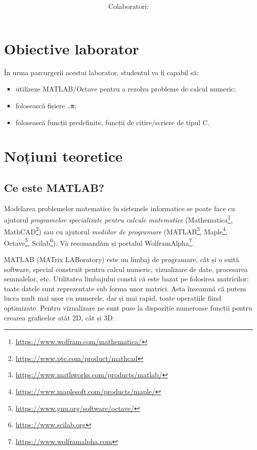 \documentclass{exam}
\title{
\textmd{\textbf{\MNLabTitle}}
\author{Colaboratori: \MNAuthor}
}
\begin{document}
\begin{coverpages}

	\maketitle
	\tableofcontents

\end{coverpages}

\section{Obiective laborator}

În urma parcurgerii acestui laborator, studentul va fi capabil să:
\begin{itemize}
	\item utilizeze MATLAB/Octave pentru a rezolva probleme de calcul numeric;
	\item folosească fișiere \verb|.m|;
	\item folosească funcții predefinite, funcții de citire/scriere de tipul C.
\end{itemize}

\section{Noțiuni teoretice}

\subsection{Ce este MATLAB?}

\par Modelarea problemelor matematice în sistemele informatice se poate face cu
ajutorul \textit{programelor specializate pentru calcule matematice}
(Mathematica\footnote{\url{https://www.wolfram.com/mathematica/}},
MathCAD\footnote{\url{https://www.ptc.com/product/mathcad}}) sau cu ajutorul
\textit{mediilor de programare} (MATLAB\footnote{\url{https://www.mathworks.com/products/matlab/}},
Maple\footnote{\url{https://www.maplesoft.com/products/maple/}},
Octave\footnote{\url{https://www.gnu.org/software/octave/}},
Scilab\footnote{\url{https://www.scilab.org}}).
Vă recomandăm și portalul WolframAlpha\footnote{\url{https://www.wolframalpha.com}}.

\par MATLAB (MATrix LABoratory) este un limbaj de programare, cât și o suită
software, special construit pentru calcul numeric, vizualizare de date,
procesarea semnalelor, etc.
Utilitatea limbajului constă că este bazat pe folosirea matricilor: toate datele sunt reprezentate sub forma unor matrici. Asta înseamnă că putem lucra mult mai ușor cu numerele, dar și mai rapid, toate operațiile fiind optimizate.
Pentru vizualizare ne sunt puse la dispoziție numeroase funcții pentru crearea graficelor atât 2D, cât și 3D.
\end{document}
